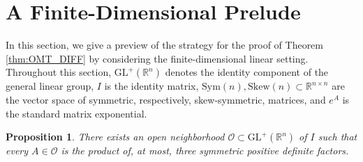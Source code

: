 \documentclass{article}
\newtheorem{proposition}[theorem]{Proposition}
\theoremstyle{remark}
\newcommand{\GL}{\mathrm{GL}^+(\mathbb{R}^n)}
\newcommand{\Sym}{\mathrm{Sym}(n)}
\newcommand{\Skew}{\mathrm{Skew}(n)}
\begin{document}
%
\section{A Finite-Dimensional Prelude}\label{sec:prelude}
%
In this section, we give a preview of the strategy for the proof of Theorem \ref{thm:OMT_DIFF} by considering the finite-dimensional linear setting. Throughout this section, $\GL$ denotes the identity component of the general linear group, $I$ is the identity matrix, $\Sym,\Skew\subset\mathbb{R}^{n\times n}$ are the vector space of symmetric, respectively, skew-symmetric, matrices, and $e^A$ is the standard matrix exponential. 
%

%
\begin{proposition}\label{prop:OMT_GL}
    There exists an open neighborhood $\mathcal{O}\subset\GL$ of $I$ such that every $A\in \mathcal{O}$ is the product of, at most, three symmetric positive definite factors.
\end{proposition}
%
\end{document}
